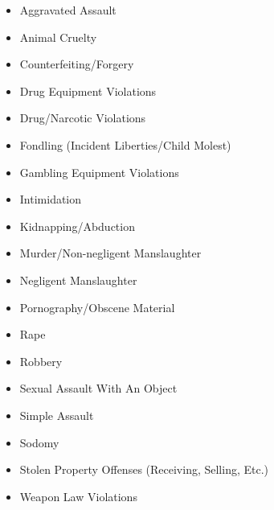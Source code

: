 \documentclass[
  12pt,
  openany]{book}
\providecommand{\tightlist}{%
  \setlength{\itemsep}{0pt}\setlength{\parskip}{0pt}}
\begin{document}
\begin{itemize}
\tightlist
\item
  Aggravated Assault
\item
  Animal Cruelty
\item
  Counterfeiting/Forgery
\item
  Drug Equipment Violations
\item
  Drug/Narcotic Violations
\item
  Fondling (Incident Liberties/Child Molest)
\item
  Gambling Equipment Violations
\item
  Intimidation
\item
  Kidnapping/Abduction
\item
  Murder/Non-negligent Manslaughter
\item
  Negligent Manslaughter
\item
  Pornography/Obscene Material
\item
  Rape
\item
  Robbery
\item
  Sexual Assault With An Object
\item
  Simple Assault
\item
  Sodomy
\item
  Stolen Property Offenses (Receiving, Selling, Etc.)
\item
  Weapon Law Violations
\end{itemize}
\end{document}
